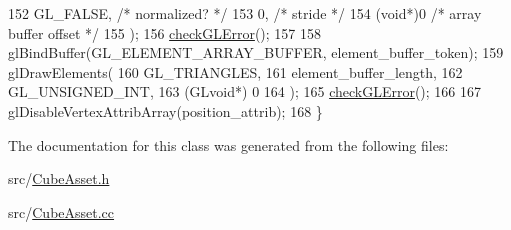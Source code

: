 \begin{DoxyCode}
152     GL\_FALSE,   \textcolor{comment}{/* normalized? */}
153     0,        \textcolor{comment}{/* stride */}
154     (\textcolor{keywordtype}{void}*)0    \textcolor{comment}{/* array buffer offset */}
155   );
156   \hyperlink{CubeAsset_8cc_a75f201b0e53e68726854997957322b8d}{checkGLError}();
157 
158   glBindBuffer(GL\_ELEMENT\_ARRAY\_BUFFER, element\_buffer\_token);
159   glDrawElements(
160     GL\_TRIANGLES,
161     element\_buffer\_length,
162     GL\_UNSIGNED\_INT,
163     (GLvoid*) 0
164   );
165   \hyperlink{CubeAsset_8cc_a75f201b0e53e68726854997957322b8d}{checkGLError}();
166 
167   glDisableVertexAttribArray(position\_attrib);
168 \}
\end{DoxyCode}


The documentation for this class was generated from the following files\+:\begin{DoxyCompactItemize}
\item 
src/\hyperlink{CubeAsset_8h}{Cube\+Asset.\+h}\item 
src/\hyperlink{CubeAsset_8cc}{Cube\+Asset.\+cc}\end{DoxyCompactItemize}

